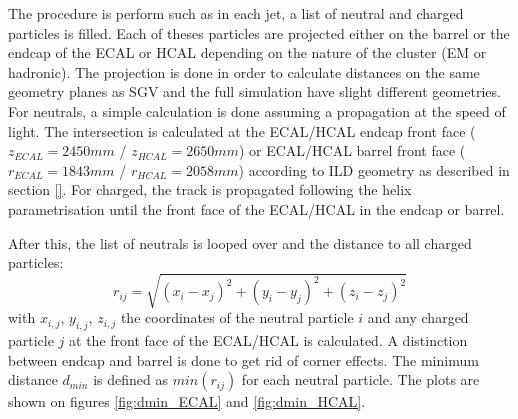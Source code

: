 The procedure is perform such as in each jet, a list of neutral and charged particles is filled. Each of theses particles are projected either on the barrel or the endcap of the ECAL or HCAL depending on the nature of the cluster (EM or hadronic). The projection is done in order to calculate distances on the same geometry planes as SGV and the full simulation have slight different geometries. For neutrals, a simple calculation is done assuming a propagation at the speed of light. The intersection is calculated at the ECAL/HCAL endcap front face ($z_{ECAL} = 2450 mm$ / $z_{HCAL} = 2650 mm$) or ECAL/HCAL barrel front face ($r_{ECAL} = 1843 mm$ / $r_{HCAL} = 2058 mm$) according to ILD geometry as described in section \ref{}. For charged, the \lcio track is propagated following the helix parametrisation until the front face of the ECAL/HCAL in the endcap or barrel.

After this, the list of neutrals is looped over and the distance to all charged particles:
\begin{equation}
  r_{ij} = \sqrt{(x_i - x_j)^2 + (y_i - y_j)^2 + (z_i - z_j)^2}
\end{equation}
with $x_{i,j}$, $y_{i,j}$, $z_{i,j}$ the coordinates of the neutral particle $i$ and any charged particle $j$ at the front face of the ECAL/HCAL is calculated. A distinction between endcap and barrel is done to get rid of corner effects. The minimum distance $d_{min}$ is defined as $min(r_{ij})$ for each neutral particle. The plots are shown on figures \ref{fig:dmin_ECAL} and \ref{fig:dmin_HCAL}.

